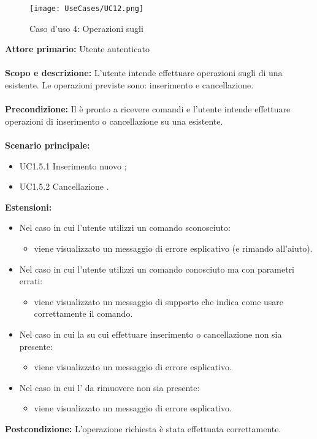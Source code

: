\documentclass{scalatekids-article}
\begin{document}
\begin{figure}[H]
  \begin{center}
    \texttt{[image: UseCases/UC12.png]}
    \caption*{Caso d'uso 4: Operazioni sugli }
  \end{center}
\end{figure}
\textbf{Attore primario:} Utente autenticato\\ \\
\textbf{Scopo e descrizione:} L'utente intende effettuare operazioni sugli  di una  esistente. Le operazioni previste sono:
inserimento e cancellazione.\\ \\
\textbf{Precondizione:} Il  è pronto a ricevere comandi e l'utente intende effettuare operazioni di inserimento o cancellazione su una  esistente.\\ \\
\textbf{Scenario principale:}
\begin{itemize}
\item UC1.5.1 Inserimento nuovo ;
\item UC1.5.2 Cancellazione .
\end{itemize}
\textbf{Estensioni:}
\begin{itemize}
\item Nel caso in cui l'utente utilizzi un comando sconosciuto:
  \begin{itemize}
  \item viene visualizzato un messaggio di errore esplicativo (e rimando all'aiuto).
  \end{itemize}
\item Nel caso in cui l'utente utilizzi un comando conosciuto ma con parametri errati:
  \begin{itemize}
  \item viene visualizzato un messaggio di supporto che indica come usare correttamente il comando.
  \end{itemize}
\item Nel caso in cui la  su cui effettuare inserimento o cancellazione non sia presente:
  \begin{itemize}
  \item viene visualizzato un messaggio di errore esplicativo.
  \end{itemize}
\item Nel caso in cui l' da rimuovere non sia presente:
  \begin{itemize}
  \item viene visualizzato un messaggio di errore esplicativo.
  \end{itemize}
\end{itemize}
\textbf{Postcondizione:} L'operazione richiesta è stata effettuata correttamente.
\end{document}
